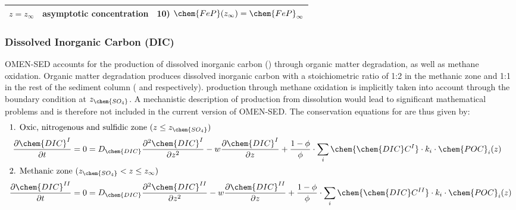 \documentclass[gmd, manuscript]{copernicus}
\begin{document}
\begin{table}[tbp]
\begin{tabular}{ |l| l| l|}
$z=z_{\infty}$& asymptotic concentration & 10) $\chem{FeP}(z_\infty)=\chem{FeP}_\infty$\\
\hline    
\end{tabular}
\label{Tab:BC_PO4+M}
\end{table}


\subsubsection{Dissolved Inorganic Carbon (DIC)}\label{subsubsec:DIC}
OMEN-SED accounts for the production of dissolved inorganic carbon () through organic matter degradation, as well as methane oxidation. 
Organic matter degradation produces dissolved inorganic carbon with a stoichiometric  ratio of 1:2 in the methanic zone and 1:1 in the rest of the sediment column ( and  respectively). 
 production through methane oxidation is implicitly taken into account through the boundary condition at $z_{\chem{SO_4}}$. 
A mechanistic description of  production from  dissolution %
would lead to significant mathematical problems and is therefore not included in the current version of OMEN-SED. 
The conservation equations for  are thus given by:
\begin{align}
\intertext{1. Oxic, nitrogenous and sulfidic zone ($z \leq z_{\chem{SO_4}}$)}
  \frac{\partial \chem{DIC}^I}{\partial t} &= 0 = D_{\chem{DIC}} \frac{\partial^2\chem{DIC}^I }{\partial z^2} - w\frac{\partial \chem{DIC}^I }{\partial z} + \frac{1-\phi}{\phi} \cdot \sum_i \chem{\chem{DIC}C^I} \cdot k_i \cdot \chem{POC}_{i}(z)\label{eq:DIC_ODE1_L1}\\ %
 \intertext{2. Methanic zone ($z_{\chem{SO_4}} < z \leq z_\infty$)} 
  \frac{\partial \chem{DIC}^{II}}{\partial t} &= 0 = D_{\chem{DIC}} \frac{\partial^2\chem{DIC}^{II} }{\partial z^2} - w\frac{\partial \chem{DIC}^{II} }{\partial z} + \frac{1-\phi}{\phi} \cdot \sum_i \chem{\chem{DIC}C^{II}} \cdot k_i \cdot \chem{POC}_{i}(z)\label{eq:DIC_ODE1_L2} %
\end{align}
\end{document}
